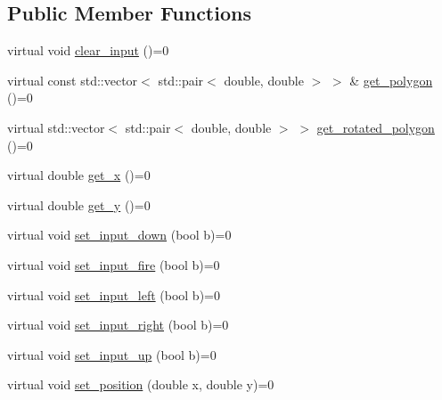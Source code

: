\subsection*{Public Member Functions}
\begin{DoxyCompactItemize}
\item 
virtual void \hyperlink{classAsteroids_1_1Domain_1_1Game_1_1Actors_1_1ActorInterface_a168455859e83a22084c372ea19de13fd}{clear\+\_\+input} ()=0
\item 
virtual const std\+::vector$<$ std\+::pair$<$ double, double $>$ $>$ \& \hyperlink{classAsteroids_1_1Domain_1_1Game_1_1Actors_1_1ActorInterface_a93f09dfff17f0addd37d216d123ed797}{get\+\_\+polygon} ()=0
\item 
virtual std\+::vector$<$ std\+::pair$<$ double, double $>$ $>$ \hyperlink{classAsteroids_1_1Domain_1_1Game_1_1Actors_1_1ActorInterface_ad6a8faa5ca09697f5614a94db525e6f0}{get\+\_\+rotated\+\_\+polygon} ()=0
\item 
virtual double \hyperlink{classAsteroids_1_1Domain_1_1Game_1_1Actors_1_1ActorInterface_a446ca9de79b6f06dafa4986133eb0c17}{get\+\_\+x} ()=0
\item 
virtual double \hyperlink{classAsteroids_1_1Domain_1_1Game_1_1Actors_1_1ActorInterface_a71d55cfa13fd2fcd77eb8f4dfbb77721}{get\+\_\+y} ()=0
\item 
virtual void \hyperlink{classAsteroids_1_1Domain_1_1Game_1_1Actors_1_1ActorInterface_acbc674bab36afc9b6851a401b7b0cfe5}{set\+\_\+input\+\_\+down} (bool b)=0
\item 
virtual void \hyperlink{classAsteroids_1_1Domain_1_1Game_1_1Actors_1_1ActorInterface_aa1d77d8c42a23f720925c763d1b1780e}{set\+\_\+input\+\_\+fire} (bool b)=0
\item 
virtual void \hyperlink{classAsteroids_1_1Domain_1_1Game_1_1Actors_1_1ActorInterface_a2871052707d65e47a71da67234fc6f93}{set\+\_\+input\+\_\+left} (bool b)=0
\item 
virtual void \hyperlink{classAsteroids_1_1Domain_1_1Game_1_1Actors_1_1ActorInterface_a9d63b00cc69e5dfec1baa65faaa6cf15}{set\+\_\+input\+\_\+right} (bool b)=0
\item 
virtual void \hyperlink{classAsteroids_1_1Domain_1_1Game_1_1Actors_1_1ActorInterface_a3f68243b241482302e31c0a4c2fd0588}{set\+\_\+input\+\_\+up} (bool b)=0
\item 
virtual void \hyperlink{classAsteroids_1_1Domain_1_1Game_1_1Actors_1_1ActorInterface_a7b1c2b10db2671640979619ca904474a}{set\+\_\+position} (double x, double y)=0
\end{DoxyCompactItemize}



